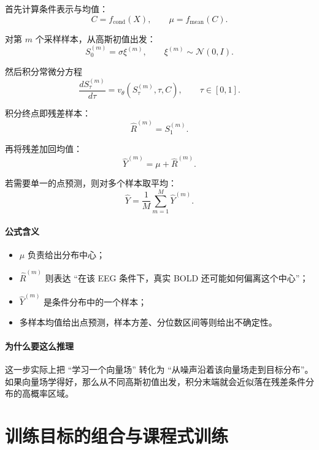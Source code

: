 \documentclass[11pt,a4paper]{ctexart}
\begin{document}
首先计算条件表示与均值：
\begin{equation}
C = f_{\mathrm{cond}}(X), \qquad
\mu = f_{\mathrm{mean}}(C).
\end{equation}

对第 $m$ 个采样样本，从高斯初值出发：
\begin{equation}
S_0^{(m)} = \sigma \xi^{(m)}, \qquad
\xi^{(m)} \sim \mathcal{N}(0,I).
\end{equation}

然后积分常微分方程
\begin{equation}
\frac{dS_\tau^{(m)}}{d\tau}
=
v_\theta(S_\tau^{(m)}, \tau, C),
\qquad \tau \in [0,1].
\end{equation}

积分终点即残差样本：
\begin{equation}
\hat{R}^{(m)} = S_1^{(m)}.
\end{equation}

再将残差加回均值：
\begin{equation}
\hat{Y}^{(m)} = \mu + \hat{R}^{(m)}.
\end{equation}

若需要单一的点预测，则对多个样本取平均：
\begin{equation}
\hat{Y} = \frac{1}{M}\sum_{m=1}^{M}\hat{Y}^{(m)}.
\end{equation}

\paragraph{公式含义}
\begin{itemize}
  \item $\mu$ 负责给出分布中心；
  \item $\hat{R}^{(m)}$ 则表达 ``在该 EEG 条件下，真实 BOLD 还可能如何偏离这个中心''；
  \item $\hat{Y}^{(m)}$ 是条件分布中的一个样本；
  \item 多样本均值给出点预测，样本方差、分位数区间等则给出不确定性。
\end{itemize}

\paragraph{为什么要这么推理}
这一步实际上把 ``学习一个向量场'' 转化为 ``从噪声沿着该向量场走到目标分布''。如果向量场学得好，那么从不同高斯初值出发，积分末端就会近似落在残差条件分布的高概率区域。

\section{训练目标的组合与课程式训练}
\end{document}
